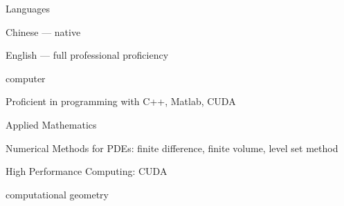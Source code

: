 
\begin{cvskills}
  \cvskill
    {Languages} %
    {
      \begin{cvitems} %
        \item {Chinese --- native}
        \item {English --- full professional proficiency}
      \end{cvitems}
    } %

  \cvskill
    {computer} %
    {
      \begin{cvitems} %
        \item {Proficient in programming with C++, Matlab, CUDA}
      \end{cvitems}
    } %

    \cvskill
    {Applied Mathematics} %
    {
      \begin{cvitems} %
        \item {Numerical Methods for PDEs: finite difference, finite volume, level set method}
        \item {High Performance Computing: CUDA}
        \item {computational geometry}
      \end{cvitems}
    } %

\end{cvskills}
